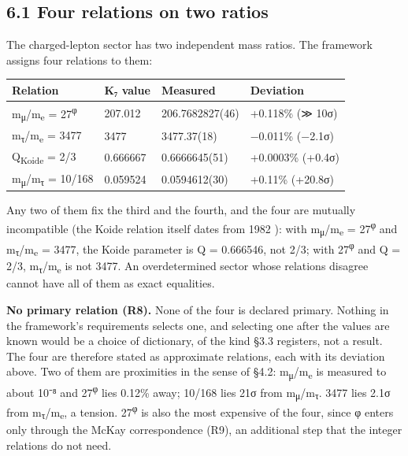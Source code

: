 \documentclass[11pt,a4paper]{article}
\begin{document}
\subsection{6.1 Four relations on two ratios}\label{four-relations-on-two-ratios}

The charged-lepton sector has two independent mass ratios. The framework assigns four relations to them:

\begin{longtable}[]{@{}llll@{}}
\toprule\noalign{}
Relation & K₇ value & Measured & Deviation \\
\midrule\noalign{}
\endhead
\bottomrule\noalign{}
\endlastfoot
m\textsubscript{μ}/m\textsubscript{e} = 27\textsuperscript{φ} & 207.012 & 206.7682827(46) & +0.118\% (≫ 10σ) \\
m\textsubscript{τ}/m\textsubscript{e} = 3477 & 3477 & 3477.37(18) & −0.011\% (−2.1σ) \\
Q\textsubscript{Koide} = 2/3 & 0.666667 & 0.6666645(51) & +0.0003\% (+0.4σ) \\
m\textsubscript{μ}/m\textsubscript{τ} = 10/168 & 0.059524 & 0.0594612(30) & +0.11\% (+20.8σ) \\
\end{longtable}

Any two of them fix the third and the fourth, and the four are mutually incompatible (the Koide relation itself dates from 1982 \cite{6}): with m\textsubscript{μ}/m\textsubscript{e} = 27\textsuperscript{φ} and m\textsubscript{τ}/m\textsubscript{e} = 3477, the Koide parameter is Q = 0.666546, not 2/3; with 27\textsuperscript{φ} and Q = 2/3, m\textsubscript{τ}/m\textsubscript{e} is not 3477. An overdetermined sector whose relations disagree cannot have all of them as exact equalities.

\textbf{No primary relation (R8).} None of the four is declared primary. Nothing in the framework's requirements selects one, and selecting one after the values are known would be a choice of dictionary, of the kind §3.3 registers, not a result. The four are therefore stated as approximate relations, each with its deviation above. Two of them are proximities in the sense of §4.2: m\textsubscript{μ}/m\textsubscript{e} is measured to about 10⁻⁸ and 27\textsuperscript{φ} lies 0.12\% away; 10/168 lies 21σ from m\textsubscript{μ}/m\textsubscript{τ}. 3477 lies 2.1σ from m\textsubscript{τ}/m\textsubscript{e}, a tension. 27\textsuperscript{φ} is also the most expensive of the four, since φ enters only through the McKay correspondence (R9), an additional step that the integer relations do not need.
\end{document}
